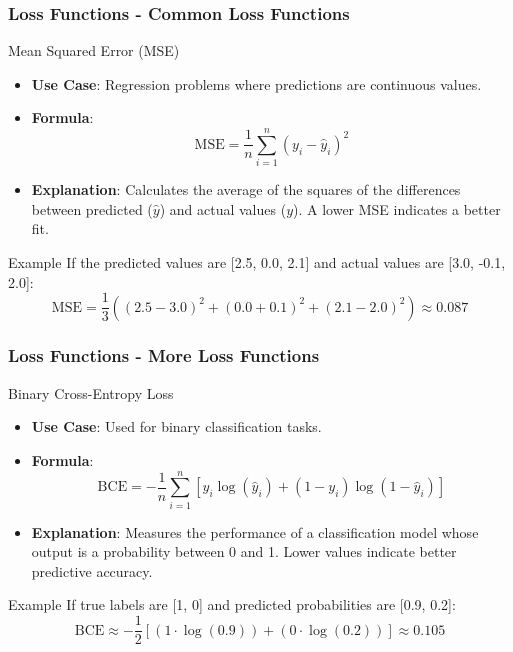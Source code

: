 \documentclass[aspectratio=169]{beamer}
\begin{document}
\begin{frame}[fragile]
    \frametitle{Loss Functions - Common Loss Functions}
    \begin{block}{Mean Squared Error (MSE)}
        \begin{itemize}
            \item \textbf{Use Case}: Regression problems where predictions are continuous values.
            \item \textbf{Formula}:
            \begin{equation}
                \text{MSE} = \frac{1}{n} \sum_{i=1}^{n} (y_i - \hat{y}_i)^2
            \end{equation}
            \item \textbf{Explanation}: Calculates the average of the squares of the differences between predicted (\(\hat{y}\)) and actual values (\(y\)). A lower MSE indicates a better fit.
        \end{itemize}
    \end{block}
    
    \begin{block}{Example}
        If the predicted values are [2.5, 0.0, 2.1] and actual values are [3.0, -0.1, 2.0]:
        \begin{equation}
            \text{MSE} = \frac{1}{3} \left((2.5-3.0)^2 + (0.0+0.1)^2 + (2.1-2.0)^2\right) \approx 0.087
        \end{equation}
    \end{block}
\end{frame}

\begin{frame}[fragile]
    \frametitle{Loss Functions - More Loss Functions}
    \begin{block}{Binary Cross-Entropy Loss}
        \begin{itemize}
            \item \textbf{Use Case}: Used for binary classification tasks.
            \item \textbf{Formula}:
            \begin{equation}
                \text{BCE} = -\frac{1}{n} \sum_{i=1}^{n} \left[y_i \log(\hat{y}_i) + (1 - y_i) \log(1 - \hat{y}_i)\right]
            \end{equation}
            \item \textbf{Explanation}: Measures the performance of a classification model whose output is a probability between 0 and 1. Lower values indicate better predictive accuracy.
        \end{itemize}
    \end{block}

    \begin{block}{Example}
        If true labels are [1, 0] and predicted probabilities are [0.9, 0.2]:
        \begin{equation}
            \text{BCE} \approx -\frac{1}{2} \left[(1 \cdot \log(0.9)) + (0 \cdot \log(0.2))\right] \approx 0.105
        \end{equation}
    \end{block}
\end{frame}
\end{document}
